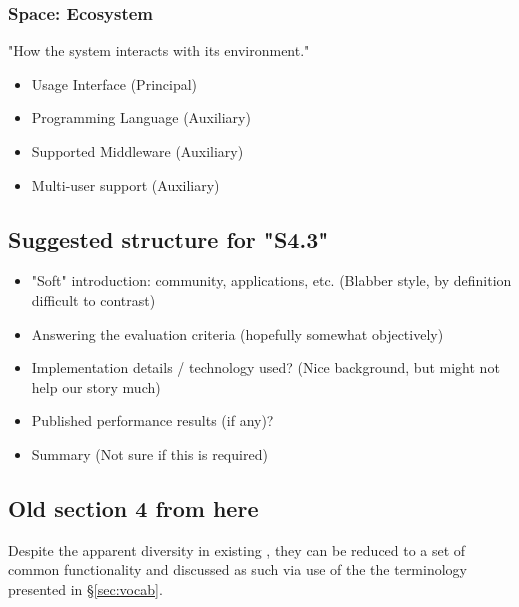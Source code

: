 \documentclass{sig-alternate}
\begin{document}
\subsubsection{Space: Ecosystem}
"How the system interacts with its environment."
\begin{itemize}
\item Usage Interface (Principal)
\item Programming Language (Auxiliary)
\item Supported Middleware (Auxiliary)
\item Multi-user support (Auxiliary)
\end{itemize}


\subsection{Suggested structure for "S4.3"}
\begin{itemize}

\item "Soft" introduction: community, applications, etc. (Blabber style, by
definition difficult to contrast)

\item Answering the evaluation criteria (hopefully somewhat objectively)

\item Implementation details / technology used? (Nice background, but might not
help our story much)

\item Published performance results (if any)?

\item Summary (Not sure if this is required)

\end{itemize}



\subsection{Old section 4 from here}


Despite the apparent diversity in existing \pilotjobs,
they can be reduced to a set of common functionality and
discussed as such via use of the the terminology presented
in \S\ref{sec:vocab}.
\end{document}
